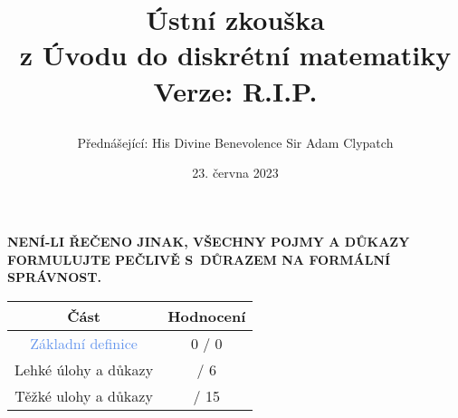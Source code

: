 \documentclass[a4paper,11pt]{article}
\title{\Huge\textsf{Ústní zkouška}\\
 \Large\textsf{z Úvodu do diskrétní matematiky}\\
 \vspace*{1em}
 Verze: R.I.P.\\
 \author{Přednášející: His Divine Benevolence Sir Adam Clypatch}
 \date{23. června 2023}
}
\begin{document}
 \maketitle
 \begin{tcolorbox}[boxsep=3mm,arc=0mm,toprule=1pt,bottomrule=1pt,leftrule=-0.1mm,
   rightrule=-0.1mm,colframe=red!90!black]
  \vspace*{-2pt}
  \begin{center}
   \textbf{NENÍ-LI ŘEČENO JINAK, VŠECHNY POJMY A DŮKAZY FORMULUJTE PEČLIVĚ
   S~DŮRAZEM NA FORMÁLNÍ SPRÁVNOST.}
  \end{center}
 \end{tcolorbox}
 \vspace*{\fill}
 \begin{center}
  \begin{tabular}{c|c}
   \textsf{\textbf{Část}} & \textsf{\textbf{Hodnocení}}\\
   \toprule
   \textcolor{CornflowerBlue}{Základní definice} & 0 / 0\\
   \textcolor{Emerald}{Lehké úlohy a důkazy} & \hspace{2ex}/ 6\\
   \textcolor{BrickRed}{Těžké ulohy a důkazy} & \hspace{2ex} / 15
  \end{tabular}
 \end{center}
 \vspace*{\fill}
 \clearpage
\end{document}
